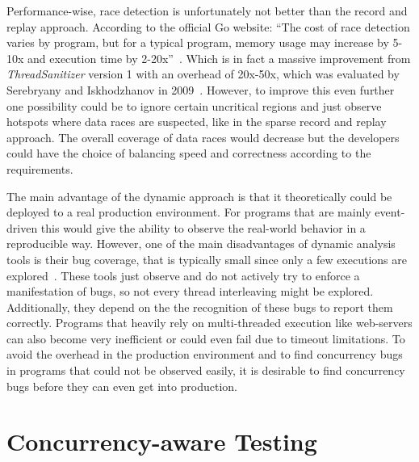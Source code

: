 \documentclass[conference]{IEEEtran}
\begin{document}
Performance-wise, race detection is unfortunately not better than the record and replay approach.
According to the official Go website: ``The cost of race detection varies by program, but for a typical program, memory usage may increase by 5-10x and execution time by 2-20x''~\cite{goRaceDetector}.
Which is in fact a massive improvement from \emph{ThreadSanitizer} version 1 with an overhead of 20x-50x, which was evaluated by Serebryany and Iskhodzhanov in 2009~\cite{serebry2009threadsanitizer}.
However, to improve this even further one possibility could be to ignore certain uncritical regions and just observe hotspots where data races are suspected, like in the sparse record and replay approach.
The overall coverage of data races would decrease but the developers could have the choice of balancing speed and correctness according to the requirements.

The main advantage of the dynamic approach is that it theoretically could be deployed to a real production environment.
For programs that are mainly event-driven this would give the ability to observe the real-world behavior in a reproducible way.
However, one of the main disadvantages of dynamic analysis tools is their bug coverage, that is typically small since only a few executions are explored~\cite{qadeer2004kiss}.
These tools just observe and do not actively try to enforce a manifestation of bugs, so not every thread interleaving might be explored.
Additionally, they depend on the the recognition of these bugs to report them correctly.
Programs that heavily rely on multi-threaded execution like web-servers can also become very inefficient or could even fail due to timeout limitations.
To avoid the overhead in the production environment and to find concurrency bugs in programs that could not be observed easily, it is desirable to find concurrency bugs before they can even get into production.


\section{Concurrency-aware Testing}
\label{sct:testing}
\end{document}
